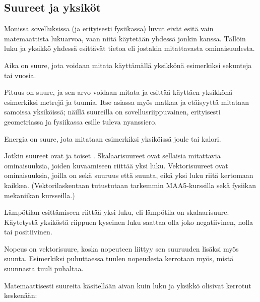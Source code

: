 \subsection*{Suureet ja yksiköt}

Monissa sovelluksissa (ja erityisesti fysiikassa) luvut eivät esitä vain matemaattista lukuarvoa, vaan niitä käytetään yhdessä jonkin  kanssa. Tällöin luku ja yksikkö yhdessä esittävät tietoa  eli jostakin mitattavasta ominaisuudesta.


\begin{esimerkki}

Aika on suure, jota voidaan mitata käyttämällä yksikkönä esimerkiksi sekunteja tai vuosia.

Pituus on suure, ja sen arvo voidaan mitata ja esittää käyttäen yksikkönä esimerkiksi metrejä ja tuumia. Itse asiassa myös matkaa ja etäisyyttä mitataan samoissa yksiköissä; näillä suureilla on sovellusriippuvainen, erityisesti geometriassa ja fysiikassa esille tuleva nyanssiero.

Energia on suure, jota mitataan esimerkiksi yksiköissä joule tai kalori.
\end{esimerkki}

Jotkin suureet ovat  ja toiset . Skalaarisuureet ovat sellaisia mitattavia ominaisuuksia, joiden kuvaamiseen riittää yksi luku. Vektorisuureet ovat ominaisuuksia, joilla on sekä suuruus että suunta, eikä yksi luku riitä kertomaan kaikkea. (Vektorilaskentaan tutustutaan tarkemmin MAA5-kurssilla sekä fysiikan mekaniikan kursseilla.)

\begin{esimerkki}

Lämpötilan esittämiseen riittää yksi luku, eli lämpötila on skalaarisuure. Käytetystä yksiköstä riippuen kyseinen luku saattaa olla joko negatiivinen, nolla tai positiivinen.

Nopeus on vektorisuure, koska nopeuteen liittyy sen suuruuden lisäksi myös suunta. Esimerkiksi puhuttaessa tuulen nopeudesta kerrotaan myös, mistä suunnasta tuuli puhaltaa.


\end{esimerkki}

Matemaattisesti suureita käsitellään aivan kuin luku ja yksikkö olisivat kerrotut keskenään:

